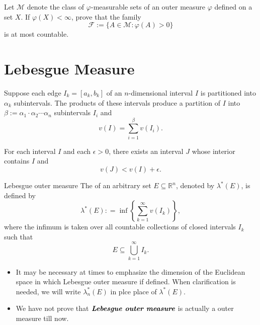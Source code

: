 \documentclass[../main.tex]{subfiles}
\begin{document}
\begin{exercise}{}{}
Let $\mathcal{M}$ denote the class of $\varphi$-measurable sets of an outer measure $\varphi$ defined on a set $X$. If $\varphi(X) < \infty$, prove that the family
\[
\mathcal{F} := \{A \in \mathcal{M} : \varphi(A) > 0\}
\]
is at most countable.
\end{exercise}


\section{Lebesgue Measure}

\begin{theorem}{}{}
Suppose each edge $I_k = [a_k, b_k]$ of an $n$-dimensional interval $I$ is partitioned into $\alpha_k$ subintervals. The products of these intervals produce a partition of $I$ into $\beta := \alpha_1 \cdot \alpha_2 \cdots \alpha_n$ subintervals $I_i$ and
\[
v(I) = \sum_{i=1}^{\beta} v(I_i).
\]
\end{theorem}


\begin{theorem}{}{}
For each interval $I$ and each $\epsilon > 0$, there exists an interval $J$ whose interior contains $I$ and
\[
v(J) < v(I) + \epsilon.
\]
\end{theorem}


\begin{definition}{Lebesgue outer measure}{}
    The  of an arbitrary set \(  E\subseteq \mathbb{R} ^{n}  \), denoted by \(   \lambda ^{*}\left( E \right)   \), is defined by \[
     \lambda ^{*}\left( E \right): = \inf \left\{ \sum _{k= 1}^{\infty}v\left( I _{k} \right)  \right\}, 
    \] where the infimum is taken over all countable collections of closed intervals \(  I _{k}  \) such that \[
    E\subseteq \bigcup _{k = 1}^{\infty}I _{k}. 
    \]  
\end{definition}

\begin{remark}
   \begin{itemize}
    \item  It may be necessary at times to emphasize the dimension of the Euclidean space in which Lebesgue outer measure if defined. When clarification is needed, we will write \(   \lambda _{n}^{*}\left( E \right)   \) in plce place of \(   \lambda ^{*}\left( E \right)   \).   
    \item We have not prove that \(  \textit{\textbf{Lebesgue outer measure}}  \) is actually a outer measure till now. 
   \end{itemize}
   
\end{remark}
\end{document}
